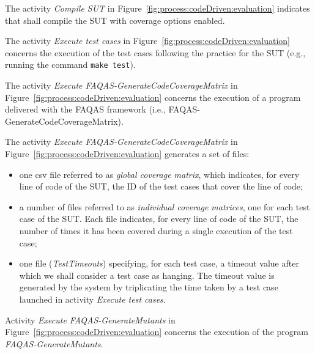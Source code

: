 The activity \emph{Compile SUT} in Figure~\ref{fig:process:codeDriven:evaluation} indicates that \MASS shall compile the SUT with coverage options enabled.



The activity \emph{Execute test cases} in Figure~\ref{fig:process:codeDriven:evaluation} concerns the execution of the test cases following the practice for the SUT (e.g., running the command \texttt{make test}).

The activity \emph{Execute FAQAS-GenerateCodeCoverageMatrix} in Figure~\ref{fig:process:codeDriven:evaluation} concerns the execution of a program delivered with the FAQAS framework (i.e., FAQAS-GenerateCodeCoverageMatrix).


The activity \emph{Execute FAQAS-GenerateCodeCoverageMatrix} in Figure~\ref{fig:process:codeDriven:evaluation} generates a set of files: 
\begin{itemize}
\item one csv file referred to as \emph{global coverage matrix}, which indicates, for every line of code of the SUT, the ID of the test cases that cover the line of code;
\item a number of files  referred to as \emph{individual coverage matrices}, one for each test case of the SUT. Each file indicates, for every line of code of the SUT, the number of times it has been covered during a single execution of the test case;
\item one file (\emph{TestTimeouts}) specifying, for each test case, a timeout value after which we shall consider a test case as hanging. The timeout value is generated by the system by triplicating the time taken by a test case launched in activity \emph{Execute test cases}.
\end{itemize}

Activity \emph{Execute FAQAS-GenerateMutants} in Figure~\ref{fig:process:codeDriven:evaluation} concerns the execution of the program \emph{FAQAS-GenerateMutants}. 

